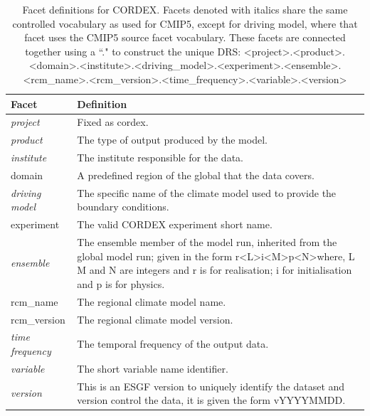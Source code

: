 \documentclass[final,1p,times,twocolumn,authoryear]{elsarticle}
\begin{document}
\begin{table}[ht!]
\label{tab:cordex}
\begin{tabular}{|p{3cm}|p{9.5cm}|}
\hline
\textbf{Facet}  & \textbf{Definition}  \\ \hline
\textit{project}         & Fixed as cordex.\\ \hline
\textit{product}         & The type of output produced by the model. \\ \hline
\textit{institute}       & The institute responsible for the data.  \\ \hline
domain          & A predefined region of the global that the data covers. \\ \hline
\textit{driving model}   & The specific name of the climate model used to provide the boundary conditions. \\ \hline
experiment      & The valid CORDEX experiment short name.\\ \hline
\textit{ensemble}        & The ensemble member of the model run, inherited from the global model run; given in the form r\textless{}L\textgreater{}i\textless{}M\textgreater{}p\textless{}N\textgreater where, L M and N are integers and r is for realisation; i for initialisation and p is for physics. \\ \hline
rcm\_name        & The regional climate model name.    \\ \hline
rcm\_version     & The regional climate model version.    \\ \hline
\textit{time frequency}  & The temporal frequency of the output data. \\ \hline
\textit{variable}        & The short variable name identifier. \\ \hline
\textit{version}         & This is an ESGF version to uniquely identify the dataset and version control the data, it is given the form vYYYYMMDD. \\
\hline

\end{tabular}
\caption{Facet definitions for CORDEX. Facets denoted with italics share the same controlled vocabulary as used for CMIP5, except for driving model, where that facet  uses the CMIP5 source facet vocabulary.
These facets are connected together using a ``." to construct the unique DRS: 
\textless{}project\textgreater{}.\textless{}product\textgreater{}.\textless{}domain\textgreater{}.\textless{}institute\textgreater{}.\textless{}driving\_model\textgreater{}.\textless{}experiment\textgreater{}.\textless{}ensemble\textgreater{}.\newline\textless{}rcm\_name\textgreater{}.\textless{}rcm\_version\textgreater{}.\textless{}time\_frequency\textgreater{}.\textless{}variable\textgreater{}.\textless{}version\textgreater{}
 \label{t:cordex}}
\end{table}
\end{document}
